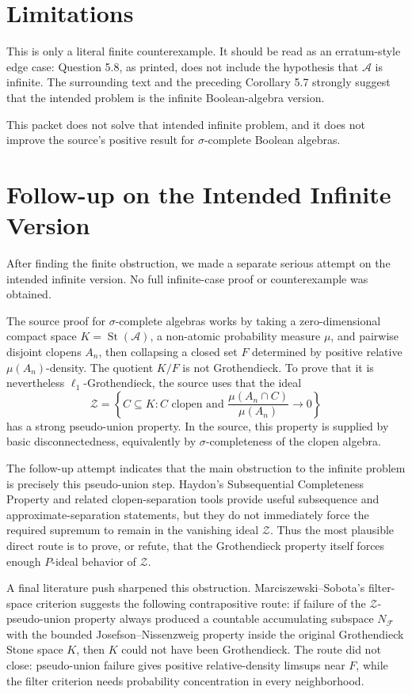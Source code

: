 \documentclass[11pt]{article}
\newcommand{\A}{\mathcal A}
\newcommand{\St}{\operatorname{St}}
\begin{document}
\section*{Limitations}

This is only a literal finite counterexample.  It should be read as an
erratum-style edge case: Question 5.8, as printed, does not include the
hypothesis that \(\A\) is infinite.  The surrounding text and the preceding
Corollary 5.7 strongly suggest that the intended problem is the infinite
Boolean-algebra version.

This packet does not solve that intended infinite problem, and it does not
improve the source's positive result for \(\sigma\)-complete Boolean algebras.

\section*{Follow-up on the Intended Infinite Version}

After finding the finite obstruction, we made a separate serious attempt on
the intended infinite version.  No full infinite-case proof or counterexample
was obtained.

The source proof for \(\sigma\)-complete algebras works by taking a
zero-dimensional compact space \(K=\St(\A)\), a non-atomic probability measure
\(\mu\), and pairwise disjoint clopens \(A_n\), then collapsing a closed set
\(F\) determined by positive relative \(\mu(A_n)\)-density.  The quotient
\(K/F\) is not Grothendieck.  To prove that it is nevertheless
\(\ell_1\)-Grothendieck, the source uses that the ideal
\[
  \mathcal Z=\left\{C\subseteq K\colon C\text{ clopen and }
  \frac{\mu(A_n\cap C)}{\mu(A_n)}\to 0\right\}
\]
has a strong pseudo-union property.  In the source, this property is supplied
by basic disconnectedness, equivalently by \(\sigma\)-completeness of the
clopen algebra.

The follow-up attempt indicates that the main obstruction to the infinite
problem is precisely this pseudo-union step.  Haydon's Subsequential
Completeness Property and related clopen-separation tools provide useful
subsequence and approximate-separation statements, but they do not immediately
force the required supremum to remain in the vanishing ideal \(\mathcal Z\).
Thus the most plausible direct route is to prove, or refute, that the
Grothendieck property itself forces enough \(P\)-ideal behavior of
\(\mathcal Z\).

A final literature push sharpened this obstruction.  Marciszewski--Sobota's
filter-space criterion suggests the following contrapositive route: if failure
of the \(\mathcal Z\)-pseudo-union property always produced a countable
accumulating subspace \(N_{\mathcal F}\) with the bounded
Josefson--Nissenzweig property inside the original Grothendieck Stone space
\(K\), then \(K\) could not have been Grothendieck.  The route did not close:
pseudo-union failure gives positive relative-density limsups near \(F\), while
the filter criterion needs probability concentration in every neighborhood.
\end{document}
